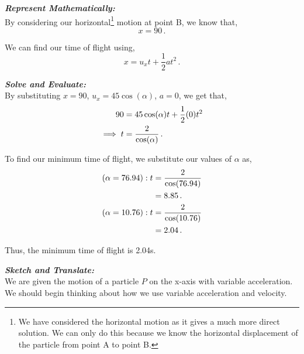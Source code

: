 \begin{subquestions}
\begin{subsubquestions}
\textbf{\textit{Represent Mathematically:}} \\
By considering our horizontal\footnote{We have considered the horizontal motion as it gives a much more direct solution. We can only do this because we know the horizontal displacement of the particle from point A to point B.} motion at point B, we know that,
\begin{equation}
	x=90 \,.
\end{equation} 

We can find our time of flight using,
\begin{equation}
	x = u_xt + \frac{1}{2}at^2 \,.	
\end{equation}




\textbf{\textit{Solve and Evaluate:}} \\
By substituting $x=90$, $u_x=45\cos(\alpha)$, $a=0$, we get that,
\begin{align}
	90 & = 45\cos(\alpha)t + \frac{1}{2}(0)t^2 \nonumber \\
	\implies t & = \frac{2}{\cos(\alpha)} \,.
\end{align}

To find our minimum time of flight, we substitute our values of $\alpha$ as,
\begin{align}
	(\alpha=76.94): t & = \frac{2}{\cos(76.94)} \nonumber \\
	                  & = 8.85 \,. \\
	(\alpha=10.76): t & = \frac{2}{\cos(10.76)} \nonumber \\
					  & = 2.04 \,. 	                  
\end{align}

Thus, the minimum time of flight is 2.04s.

\end{subsubquestions}
	

\subquestion

\textbf{\textit{Sketch and Translate:}} \\

We are given the motion of a particle $P$ on the x-axis with variable acceleration. We should begin thinking about how we use variable acceleration and velocity.\\





\end{subquestions}
